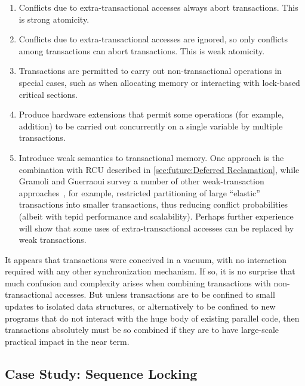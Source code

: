 \begin{enumerate}
\item	Conflicts due to extra-transactional accesses always abort
	transactions.
	This is strong atomicity.
\item	Conflicts due to extra-transactional accesses are ignored,
	so only conflicts among transactions can abort transactions.
	This is weak atomicity.
\item	Transactions are permitted to carry out non-transactional
	operations in special cases, such as when allocating memory or
	interacting with lock-based critical sections.
\item	Produce hardware extensions that permit some operations
	(for example, addition) to be carried out concurrently on a
	single variable by multiple transactions.
\item	Introduce weak semantics to transactional memory.
	One approach is the combination with RCU described in
	\cref{sec:future:Deferred Reclamation},
	while Gramoli and Guerraoui
	survey a number of other weak-transaction
	approaches~\cite{Gramoli:2014:DTP:2541883.2541900}, for example,
	restricted partitioning of large
	``elastic'' transactions into smaller transactions, thus
	reducing conflict probabilities (albeit with tepid performance
	and scalability).
	Perhaps further experience will show that some uses of
	extra-transactional accesses can be replaced by weak
	transactions.
\end{enumerate}

It appears that transactions were conceived in a vacuum, with no
interaction required with any other synchronization mechanism.
If so, it is no surprise that much confusion and complexity arises when
combining transactions with non-transactional accesses.
But unless transactions are to be confined to small updates to isolated
data structures, or alternatively to be confined to new programs
that do not interact with the huge body of existing parallel code,
then transactions absolutely must be so combined if they are to have
large-scale practical impact in the near term.


\subsection{Case Study:
	    Sequence Locking}
\label{sec:future:Case Study: Sequence Locking}

